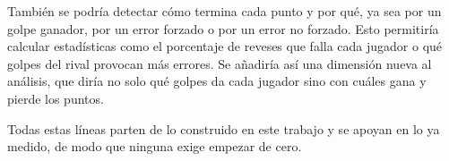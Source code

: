También se podría detectar cómo termina cada punto y por qué, ya sea por un golpe ganador, por un error forzado o por un error no forzado.
Esto permitiría calcular estadísticas como el porcentaje de reveses que falla cada jugador o qué golpes del rival provocan más errores.
Se añadiría así una dimensión nueva al análisis, que diría no solo qué golpes da cada jugador sino con cuáles gana y pierde los puntos.

Todas estas líneas parten de lo construido en este trabajo y se apoyan en lo ya medido, de modo que ninguna exige empezar de cero.
